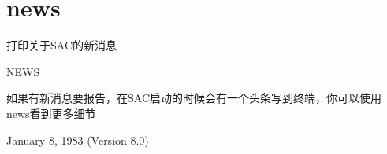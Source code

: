 \section{news}
\label{cmd:news}

打印关于SAC的新消息

NEWS

如果有新消息要报告，在SAC启动的时候会有一个头条写到终端，你可以使用news看到更多细节

January 8, 1983 (Version 8.0)
